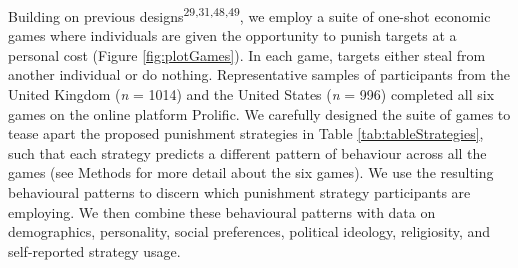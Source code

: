 \documentclass[
  man,floatsintext]{apa6}
\begin{document}
Building on previous designs\textsuperscript{29,31,48,49}, we employ a suite of one-shot economic games where individuals
are given the opportunity to punish targets at a personal cost (Figure
\ref{fig:plotGames}). In each game, targets either steal from another
individual or do nothing. Representative samples of participants from the United
Kingdom (\emph{n} = 1014) and the
United States (\emph{n} = 996)
completed all six games on the online platform Prolific. We carefully designed
the suite of games to tease apart the proposed punishment strategies in Table
\ref{tab:tableStrategies}, such that each strategy predicts a different pattern
of behaviour across all the games (see Methods for more detail about the six
games). We use the resulting behavioural patterns to discern which punishment
strategy participants are employing. We then combine these behavioural patterns
with data on demographics, personality, social preferences, political ideology,
religiosity, and self-reported strategy usage.
\end{document}
